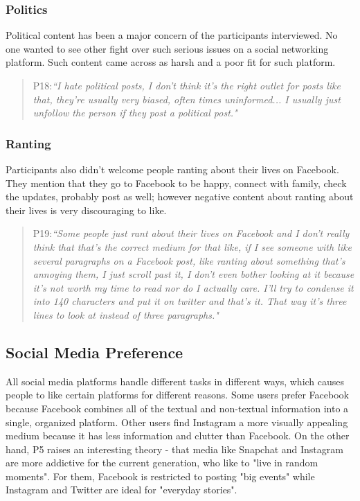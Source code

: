 \subsubsection{Politics}
Political content has been a major concern of the participants interviewed. No one wanted to see other fight over such serious issues on a social networking platform. Such content came across as harsh and a poor fit for such platform.
\begin{quote}
P18:\textit{``I hate political posts, I don't think it's the right outlet for posts like that, they're usually very biased, often times uninformed... I usually just unfollow the person if they post a political post."}
\end{quote}

\subsubsection{Ranting}
Participants also didn't welcome people ranting about their lives on Facebook. They mention that they go to Facebook to be happy, connect with family, check the updates, probably post as well; however negative content about ranting about their lives is very discouraging to like.
\begin{quote}
P19:\textit{``Some people just rant about their lives on Facebook and I don't really think that that's the correct medium for that like, if I see someone with like several paragraphs on a Facebook post, like ranting about something that's annoying them, I just scroll past it, I don't even bother looking at it because it's not worth my time to read nor do I actually care. I'll try to condense it into 140 characters and put it on twitter and that's it. That way it's three lines to look at instead of three paragraphs."}
\end{quote}

\subsection{Social Media Preference}
All social media platforms handle different tasks in different ways, which causes people to like certain platforms for different reasons. Some users prefer Facebook because Facebook combines all of the textual and non-textual information into a single, organized platform. Other users find Instagram a more visually appealing medium because it has less information and clutter than Facebook. On the other hand, P5 raises an interesting theory - that media like Snapchat and Instagram are more addictive for the current generation, who like to "live in random moments". For them, Facebook is restricted to posting "big events" while Instagram and Twitter are ideal for "everyday stories".

